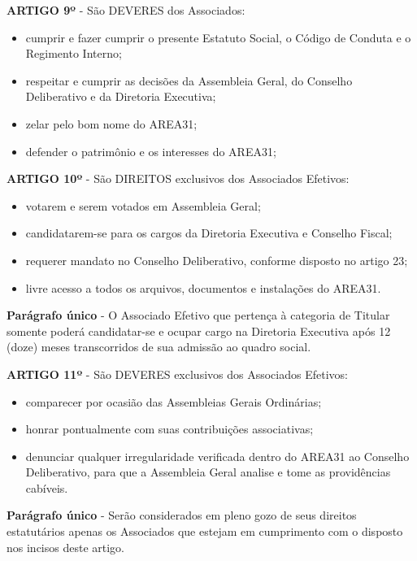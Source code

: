 \textbf{ARTIGO 9º} - São DEVERES dos Associados:

\begin{itemize}
    \item cumprir e fazer cumprir o presente Estatuto Social, o Código de 
        Conduta e o Regimento Interno; 
    \item respeitar e cumprir as decisões da Assembleia Geral, do Conselho 
        Deliberativo e da Diretoria Executiva;
    \item zelar pelo bom nome do AREA31;
    \item defender o patrimônio e os interesses do AREA31;
\end{itemize}

\textbf{ARTIGO 10º} - São DIREITOS exclusivos dos Associados Efetivos:

\begin{itemize}
    \item votarem e serem votados em Assembleia Geral;
    \item candidatarem-se para os cargos da Diretoria Executiva e 
        Conselho Fiscal;
    \item requerer mandato no Conselho Deliberativo, conforme disposto 
        no artigo 23;
    \item livre acesso a todos os arquivos, documentos e instalações do AREA31.
\end{itemize}

\textbf{Parágrafo único} - O Associado Efetivo que pertença à categoria de 
Titular somente poderá candidatar-se e ocupar cargo na Diretoria Executiva 
após 12 (doze) meses transcorridos de sua admissão ao quadro social.

\bigskip

\textbf{ARTIGO 11º} - São DEVERES exclusivos dos Associados Efetivos:

\begin{itemize}
    \item comparecer por ocasião das Assembleias Gerais Ordinárias;
    \item honrar pontualmente com suas contribuições associativas;
    \item denunciar qualquer irregularidade verificada dentro do AREA31 ao 
        Conselho Deliberativo, para que a Assembleia Geral analise 
        e tome as providências cabíveis.
\end{itemize}

\textbf{Parágrafo único} - Serão considerados em pleno gozo de seus direitos 
estatutários apenas os Associados que estejam em cumprimento com o 
disposto nos incisos deste artigo.


